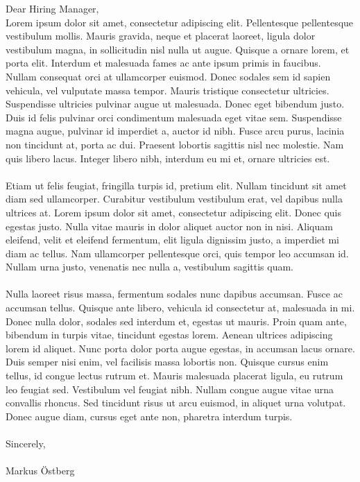 \documentclass{markusos-letter}
\begin{document}
\begin{entrylist}
\entry
{Dear Hiring Manager,}
{
\\
Lorem ipsum dolor sit amet, consectetur adipiscing elit. Pellentesque pellentesque vestibulum mollis. Mauris gravida, neque et placerat laoreet, ligula dolor vestibulum magna, in sollicitudin nisl nulla ut augue. Quisque a ornare lorem, et porta elit. Interdum et malesuada fames ac ante ipsum primis in faucibus. Nullam consequat orci at ullamcorper euismod. Donec sodales sem id sapien vehicula, vel vulputate massa tempor. Mauris tristique consectetur ultricies. Suspendisse ultricies pulvinar augue ut malesuada. Donec eget bibendum justo. Duis id felis pulvinar orci condimentum malesuada eget vitae sem. Suspendisse magna augue, pulvinar id imperdiet a, auctor id nibh. Fusce arcu purus, lacinia non tincidunt at, porta ac dui. Praesent lobortis sagittis nisl nec molestie. Nam quis libero lacus. Integer libero nibh, interdum eu mi et, ornare ultricies est.
\\\\
Etiam ut felis feugiat, fringilla turpis id, pretium elit. Nullam tincidunt sit amet diam sed ullamcorper. Curabitur vestibulum vestibulum erat, vel dapibus nulla ultrices at. Lorem ipsum dolor sit amet, consectetur adipiscing elit. Donec quis egestas justo. Nulla vitae mauris in dolor aliquet auctor non in nisi. Aliquam eleifend, velit et eleifend fermentum, elit ligula dignissim justo, a imperdiet mi diam ac tellus. Nam ullamcorper pellentesque orci, quis tempor leo accumsan id. Nullam urna justo, venenatis nec nulla a, vestibulum sagittis quam.
\\\\
Nulla laoreet risus massa, fermentum sodales nunc dapibus accumsan. Fusce ac accumsan tellus. Quisque ante libero, vehicula id consectetur at, malesuada in mi. Donec nulla dolor, sodales sed interdum et, egestas ut mauris. Proin quam ante, bibendum in turpis vitae, tincidunt egestas lorem. Aenean ultrices adipiscing lorem id aliquet. Nunc porta dolor porta augue egestas, in accumsan lacus ornare. Duis semper nisi enim, vel facilisis massa lobortis non. Quisque cursus enim tellus, id congue lectus rutrum et. Mauris malesuada placerat ligula, eu rutrum leo feugiat sed. Vestibulum vel feugiat nibh. Nullam congue augue vitae urna convallis rhoncus. Sed tincidunt risus ut arcu euismod, in aliquet urna volutpat. Donec augue diam, cursus eget ante non, pharetra interdum turpis.
\\\\
Sincerely,
\\\\
Markus Östberg
}
\end{entrylist}
\end{document}
